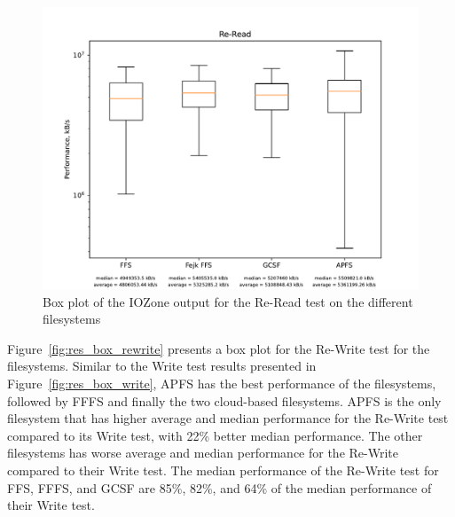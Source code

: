 \begin{figure}[!ht]
	\label{fig:res_box_reread}
	\begin{center}
		\includegraphics[width=1.0\textwidth]{figures/benchmarking/Re-Read_box.pdf}
	\end{center}
	\caption{Box plot of the IOZone output for the Re-Read test on the different filesystems}
\end{figure}

\FloatBarrier

Figure~\ref{fig:res_box_rewrite} presents a box plot for the \mbox{Re-Write} test for the filesystems. Similar to the Write test results presented in Figure~\ref{fig:res_box_write}, \gls{APFS} has the best performance of the filesystems, followed by \gls{FFFS} and finally the two cloud-based filesystems. \gls{APFS} is the only filesystem that has higher average and median performance for the \mbox{Re-Write} test compared to its Write test, with 22\% better median performance. The other filesystems has worse average and median performance for the \mbox{Re-Write} compared to their Write test. The median performance of the \mbox{Re-Write} test for \gls{FFS}, \gls{FFFS}, and \gls{GCSF} are 85\%, 82\%, and 64\% of the median performance of their Write test. 

